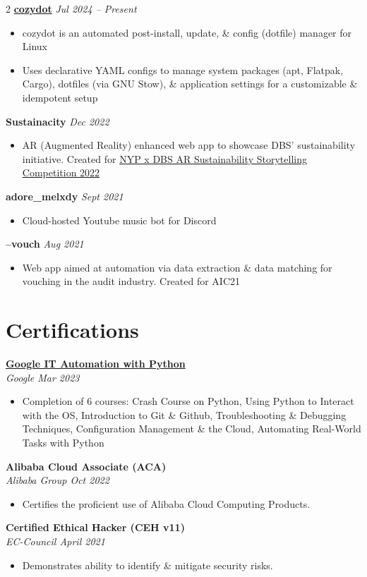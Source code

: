 \documentclass[a4paper,11pt]{article}
\newcommand{\entryHeader}[2]{\noindent\textbf{#1} \\ \textit{#2}}
\newcommand{\singleEntry}[2]{\noindent\textbf{#1} \hfill \textit{#2}}
\begin{document}
\begin{multicols}{2}
\smallskip
\singleEntry{\href{https://github.com/adoreblvnk/cozydot}{cozydot}}{Jul 2024 -- Present}
\begin{itemize}
    \item cozydot is an automated post-install, update, \& config (dotfile) manager for Linux
    \item Uses declarative YAML configs to manage system packages (apt, Flatpak, Cargo), dotfiles (via GNU Stow), \& application settings for a customizable \& idempotent setup
\end{itemize}

\smallskip
\singleEntry{Sustainacity}{Dec 2022}
\begin{itemize}
    \item AR (Augmented Reality) enhanced web app to showcase DBS' sustainability initiative. Created for \href{https://zealous.co/sbm/opportunity/NYP-x-DBS-AR-Sustainability-Storytelling-Competition-2022}{NYP x DBS AR Sustainability Storytelling Competition 2022}
\end{itemize}

\smallskip
\singleEntry{adore\_melxdy}{Sept 2021}
\begin{itemize}
    \item Cloud-hosted Youtube music bot for Discord
\end{itemize}

\smallskip
\singleEntry{--vouch}{Aug 2021}
\begin{itemize}
    \item Web app aimed at automation via data extraction \& data matching for vouching in the audit industry. Created for AIC21
\end{itemize}

\section*{Certifications}
\entryHeader{\href{https://www.credly.com/badges/a63e9a42-be6c-4f6c-a68a-cddbadca1604}{Google IT Automation with Python}}{Google \hfill Mar 2023}
\begin{itemize}
    \item Completion of 6 courses: Crash Course on Python, Using Python to Interact with the OS, Introduction to Git \& Github, Troubleshooting \& Debugging Techniques, Configuration Management \& the Cloud, Automating Real-World Tasks with Python
\end{itemize}

\smallskip
\entryHeader{Alibaba Cloud Associate (ACA)}{Alibaba Group \hfill Oct 2022}
\begin{itemize}
    \item Certifies the proficient use of Alibaba Cloud Computing Products.
\end{itemize}

\smallskip
\entryHeader{Certified Ethical Hacker (CEH v11)}{EC-Council \hfill April 2021}
\begin{itemize}
    \item Demonstrates ability to identify \& mitigate security risks.
\end{itemize}

\end{multicols}
\end{document}
